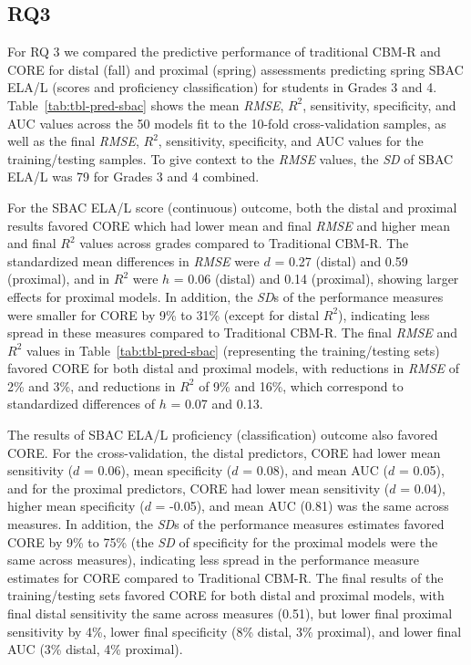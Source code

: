 \documentclass[
  english,
  man, fleqn, noextraspace]{apa6}
\begin{document}
\hypertarget{rq3}{%
\subsection{RQ3}\label{rq3}}

For RQ 3 we compared the predictive performance of traditional CBM-R and CORE for distal (fall) and proximal (spring) assessments predicting spring SBAC ELA/L (scores and proficiency classification) for students in Grades 3 and 4. Table~\ref{tab:tbl-pred-sbac} shows the mean \emph{RMSE}, \(R^2\), sensitivity, specificity, and AUC values across the 50 models fit to the 10-fold cross-validation samples, as well as the final \emph{RMSE}, \(R^2\), sensitivity, specificity, and AUC values for the training/testing samples. To give context to the \emph{RMSE} values, the \emph{SD} of SBAC ELA/L was 79 for Grades 3 and 4 combined.

For the SBAC ELA/L score (continuous) outcome, both the distal and proximal results favored CORE which had lower mean and final \emph{RMSE} and higher mean and final \(R^2\) values across grades compared to Traditional CBM-R. The standardized mean differences in \emph{RMSE} were \(d\) = 0.27 (distal) and 0.59 (proximal), and in \(R^2\) were \(h\) = 0.06 (distal) and 0.14 (proximal), showing larger effects for proximal models. In addition, the \emph{SD}s of the performance measures were smaller for CORE by 9\% to 31\% (except for distal \(R^2\)), indicating less spread in these measures compared to Traditional CBM-R. The final \emph{RMSE} and \(R^2\) values in Table~\ref{tab:tbl-pred-sbac} (representing the training/testing sets) favored CORE for both distal and proximal models, with reductions in \emph{RMSE} of 2\% and 3\%, and reductions in \(R^2\) of 9\% and 16\%, which correspond to standardized differences of \(h\) = 0.07 and 0.13.

The results of SBAC ELA/L proficiency (classification) outcome also favored CORE. For the cross-validation, the distal predictors, CORE had lower mean sensitivity (\(d\) = 0.06), mean specificity (\(d\) = 0.08), and mean AUC (\(d\) = 0.05), and for the proximal predictors, CORE had lower mean sensitivity (\(d\) = 0.04), higher mean specificity (\(d\) = -0.05), and mean AUC (0.81) was the same across measures. In addition, the \emph{SD}s of the performance measures estimates favored CORE by 9\% to 75\% (the \emph{SD} of specificity for the proximal models were the same across measures), indicating less spread in the performance measure estimates for CORE compared to Traditional CBM-R. The final results of the training/testing sets favored CORE for both distal and proximal models, with final distal sensitivity the same across measures (0.51), but lower final proximal sensitivity by 4\%, lower final specificity (8\% distal, 3\% proximal), and lower final AUC (3\% distal, 4\% proximal).
\end{document}
